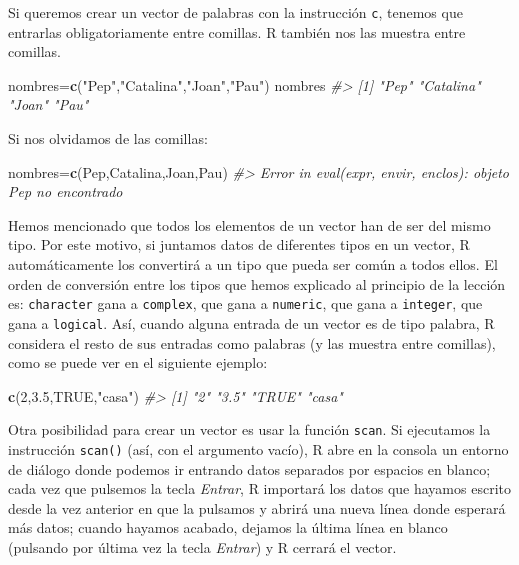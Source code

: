 \documentclass[
]{book}
\newenvironment{Shaded}{\begin{snugshade}}{\end{snugshade}}
\newcommand{\CommentTok}[1]{\textcolor[rgb]{0.56,0.35,0.01}{\textit{#1}}}
\newcommand{\DecValTok}[1]{\textcolor[rgb]{0.00,0.00,0.81}{#1}}
\newcommand{\FloatTok}[1]{\textcolor[rgb]{0.00,0.00,0.81}{#1}}
\newcommand{\KeywordTok}[1]{\textcolor[rgb]{0.13,0.29,0.53}{\textbf{#1}}}
\newcommand{\NormalTok}[1]{#1}
\newcommand{\OtherTok}[1]{\textcolor[rgb]{0.56,0.35,0.01}{#1}}
\newcommand{\StringTok}[1]{\textcolor[rgb]{0.31,0.60,0.02}{#1}}
\theoremstyle{definition}
\theoremstyle{definition}
\theoremstyle{definition}
\theoremstyle{remark}
\begin{document}
Si queremos crear un vector de palabras con la instrucción \texttt{c}, tenemos que entrarlas obligatoriamente entre comillas. R también nos las muestra entre comillas.

\begin{Shaded}
\begin{Highlighting}[]
\NormalTok{nombres=}\KeywordTok{c}\NormalTok{(}\StringTok{"Pep"}\NormalTok{,}\StringTok{"Catalina"}\NormalTok{,}\StringTok{"Joan"}\NormalTok{,}\StringTok{"Pau"}\NormalTok{)}
\NormalTok{nombres}
\CommentTok{\#\textgreater{} [1] "Pep"      "Catalina" "Joan"     "Pau"}
\end{Highlighting}
\end{Shaded}

Si nos olvidamos de las comillas:

\begin{Shaded}
\begin{Highlighting}[]
\NormalTok{nombres=}\KeywordTok{c}\NormalTok{(Pep,Catalina,Joan,Pau)}
\CommentTok{\#\textgreater{} Error in eval(expr, envir, enclos): objeto \textquotesingle{}Pep\textquotesingle{} no encontrado}
\end{Highlighting}
\end{Shaded}

Hemos mencionado que todos los elementos de un vector han de ser del mismo tipo. Por este motivo, si juntamos datos de diferentes tipos en un vector, R automáticamente los convertirá a un tipo que pueda ser común a todos ellos. El orden de conversión entre los tipos que hemos explicado al principio de la lección es: \texttt{character} gana a \texttt{complex}, que gana a \texttt{numeric}, que gana a \texttt{integer}, que gana a \texttt{logical}. Así, cuando alguna entrada de un vector es de tipo palabra, R considera el resto de sus entradas como palabras (y las muestra entre comillas), como se puede ver en el siguiente ejemplo:

\begin{Shaded}
\begin{Highlighting}[]
\KeywordTok{c}\NormalTok{(}\DecValTok{2}\NormalTok{,}\FloatTok{3.5}\NormalTok{,}\OtherTok{TRUE}\NormalTok{,}\StringTok{"casa"}\NormalTok{)}
\CommentTok{\#\textgreater{} [1] "2"    "3.5"  "TRUE" "casa"}
\end{Highlighting}
\end{Shaded}

Otra posibilidad para crear un vector es usar la función \texttt{scan}.
Si ejecutamos la instrucción \texttt{scan()} (así, con el argumento vacío), R abre en la consola un entorno de diálogo donde podemos ir entrando datos separados por espacios en blanco; cada vez que pulsemos la tecla \emph{Entrar}, R importará los datos que hayamos escrito desde la vez anterior en que la pulsamos y abrirá una nueva línea donde esperará más datos; cuando hayamos acabado, dejamos la última línea en blanco (pulsando por última vez la tecla \emph{Entrar}) y R cerrará el vector.
\end{document}
